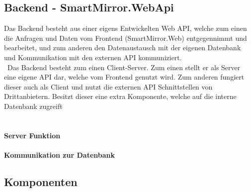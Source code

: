 \subsection{Backend - SmartMirror.WebApi}
Das Backend besteht aus einer eigens Entwickelten Web API, welche zum einen die Anfragen und Daten vom Frontend (SmartMirror.Web) entgegennimmt und bearbeitet, und zum anderen den Datenaustausch mit der eigenen Datenbank und Kommunikation mit den externen API kommuniziert.\\\
Das Backend besteht zum einen Client-Server. Zum einen stellt er als Server eine eigene API dar, welche vom Frontend genutzt wird. Zum anderen fungiert dieser auch als Client und nutzt die externen API Schnittstellen von Drittanbietern. Besitzt dieser eine extra Komponente, welche auf die interne Datenbank zugreift\\\



\paragraph{Server Funktion}

\paragraph{Kommunikation zur Datenbank}


\subsection{Komponenten}\label{Komponenten}
